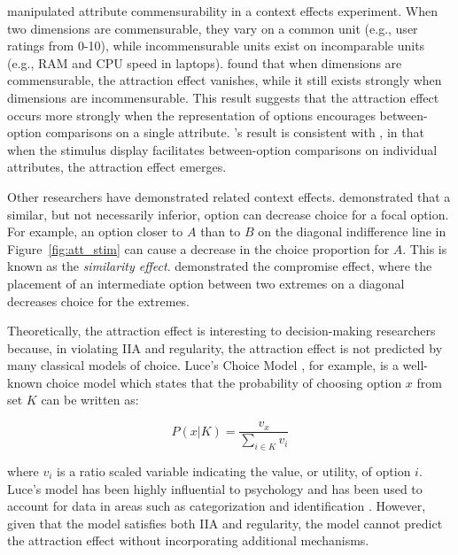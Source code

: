 \textcite{hayes2024attribute} manipulated attribute commensurability in a context effects experiment. When two dimensions are commensurable, they vary on a common unit (e.g., user ratings from 0-10), while incommensurable units exist on incomparable units (e.g., RAM and CPU speed in laptops). \textcite{hayes2024attribute} found that when dimensions are commensurable, the attraction effect vanishes, while it still exists strongly when dimensions are incommensurable. This result suggests that the attraction effect occurs more strongly when the representation of options encourages between-option comparisons on a single attribute. \textcite{hayes2024attribute}'s result is consistent with \textcite{cataldoComparisonProcessAccount2019b}, in that when the stimulus display facilitates between-option comparisons on individual attributes, the attraction effect emerges.

Other researchers have demonstrated related context effects. \textcite{tverskyEliminationAspectsTheory1972} demonstrated that a similar, but not necessarily inferior, option can decrease choice for a focal option. For example, an option closer to $A$ than to $B$ on the diagonal indifference line in Figure~\ref{fig:att_stim} can cause a decrease in the choice proportion for $A$. This is known as the \textit{similarity effect}. \textcite{simonsonChoiceBasedReasons1989b} demonstrated the compromise effect, where the placement of an intermediate option between two extremes on a diagonal decreases choice for the extremes. 

Theoretically, the attraction effect is interesting to decision-making researchers because, in violating IIA and regularity, the attraction effect is not predicted by many classical models of choice. Luce's Choice Model \parencite{luce1959individual}, for example, is a well-known choice model which states that the probability of choosing option $x$ from set $K$ can be written as:

\begin{equation}
    P(x|K) = \frac{v_{x}}{\sum_{i \in K} v_{i}}
\end{equation}

where $v_{i}$ is a ratio scaled variable indicating the value, or utility, of option $i$. Luce's model has been highly influential to psychology and has been used to account for data in areas such as categorization \parencite{nosofskyAttentionSimilarityIdentificationCategorization1986} and identification \parencite{townsend1971theoretical}. However, given that the model satisfies both IIA and regularity, the model cannot predict the attraction effect without incorporating additional mechanisms. 

